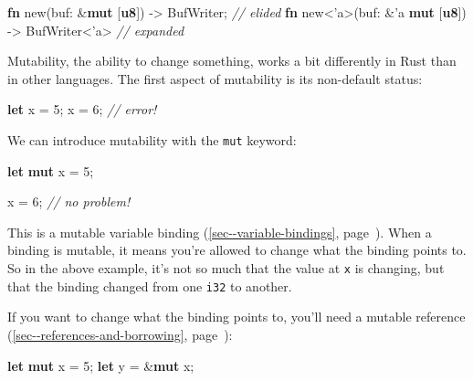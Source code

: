 \documentclass[a4paper,]{book}
\renewcommand*{\hyperref}[2][\ar]{%
  \def\ar{#2}%
  #2 (\autoref{#1}, page~\pageref{#1})}
\newenvironment{Shaded}{\begin{snugshade}}{\end{snugshade}}
\newcommand{\KeywordTok}[1]{\textcolor[rgb]{0.13,0.29,0.53}{\textbf{{#1}}}}
\newcommand{\DecValTok}[1]{\textcolor[rgb]{0.00,0.00,0.81}{{#1}}}
\newcommand{\CommentTok}[1]{\textcolor[rgb]{0.56,0.35,0.01}{\textit{{#1}}}}
\newcommand{\OtherTok}[1]{\textcolor[rgb]{0.56,0.35,0.01}{{#1}}}
\newcommand{\NormalTok}[1]{{#1}}
\begin{document}
\begin{Shaded}
\begin{Highlighting}[]
\KeywordTok{fn} \NormalTok{new(buf: &}\KeywordTok{mut} \NormalTok{[}\KeywordTok{u8}\NormalTok{]) -> BufWriter; }\CommentTok{// elided}
\KeywordTok{fn} \NormalTok{new<}\OtherTok{'a}\NormalTok{>(buf: &}\OtherTok{'a} \KeywordTok{mut} \NormalTok{[}\KeywordTok{u8}\NormalTok{]) -> BufWriter<}\OtherTok{'a}\NormalTok{> }\CommentTok{// expanded}
\end{Highlighting}
\end{Shaded}


Mutability, the ability to change something, works a bit differently in
Rust than in other languages. The first aspect of mutability is its
non-default status:

\begin{Shaded}
\begin{Highlighting}[]
\KeywordTok{let} \NormalTok{x = }\DecValTok{5}\NormalTok{;}
\NormalTok{x = }\DecValTok{6}\NormalTok{; }\CommentTok{// error!}
\end{Highlighting}
\end{Shaded}

We can introduce mutability with the \texttt{mut} keyword:

\begin{Shaded}
\begin{Highlighting}[]
\KeywordTok{let} \KeywordTok{mut} \NormalTok{x = }\DecValTok{5}\NormalTok{;}

\NormalTok{x = }\DecValTok{6}\NormalTok{; }\CommentTok{// no problem!}
\end{Highlighting}
\end{Shaded}

This is a mutable \hyperref[sec--variable-bindings]{variable binding}.
When a binding is mutable, it means you're allowed to change what the
binding points to. So in the above example, it's not so much that the
value at \texttt{x} is changing, but that the binding changed from one
\texttt{i32} to another.

If you want to change what the binding points to, you'll need a
\hyperref[sec--references-and-borrowing]{mutable reference}:

\begin{Shaded}
\begin{Highlighting}[]
\KeywordTok{let} \KeywordTok{mut} \NormalTok{x = }\DecValTok{5}\NormalTok{;}
\KeywordTok{let} \NormalTok{y = &}\KeywordTok{mut} \NormalTok{x;}
\end{Highlighting}
\end{Shaded}
\end{document}
